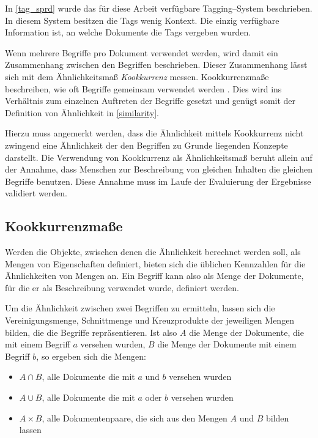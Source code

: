 In \cref{tag_sprd} wurde das für diese Arbeit verfügbare Tagging--System beschrieben. In diesem System besitzen die Tags wenig Kontext. Die einzig verfügbare Information ist, an welche Dokumente die Tags vergeben wurden.

Wenn mehrere Begriffe pro Dokument verwendet werden, wird damit ein Zusammenhang zwischen den Begriffen beschrieben. Dieser Zusammenhang lässt sich mit dem Ähnlichkeitsmaß \emph{Kookkurrenz} messen. Kookkurrenzmaße beschreiben, wie oft Begriffe gemeinsam verwendet werden \cite[S. 21]{zz2011}. Dies wird ins Verhältnis zum einzelnen Auftreten der Begriffe gesetzt und genügt somit der Definition von Ähnlichkeit in \cref{similarity}.

Hierzu muss angemerkt werden, dass die Ähnlichkeit mittels Kookkurrenz nicht zwingend eine Ähnlichkeit der den Begriffen zu Grunde liegenden Konzepte darstellt. Die Verwendung von Kookkurrenz als Ähnlichkeitsmaß beruht allein auf der Annahme, dass Menschen zur Beschreibung von gleichen Inhalten die gleichen Begriffe benutzen. Diese Annahme muss im Laufe der Evaluierung der Ergebnisse validiert werden.

\subsection{Kookkurrenzmaße}
\label{measures}

Werden die Objekte, zwischen denen die Ähnlichkeit berechnet werden soll, als Mengen von Eigenschaften definiert, bieten sich die üblichen Kennzahlen für die Ähnlichkeiten von Mengen an. Ein Begriff kann also als Menge der Dokumente, für die er als Beschreibung verwendet wurde, definiert werden.

Um die Ähnlichkeit zwischen zwei Begriffen zu ermitteln, lassen sich die Vereinigungsmenge, Schnittmenge und Kreuzprodukte der jeweiligen Mengen bilden, die die Begriffe repräsentieren. Ist also \(A\) die Menge der Dokumente, die mit einem Begriff \(a\) versehen wurden, \(B\) die Menge der Dokumente mit einem Begriff \(b\), so ergeben sich die Mengen:

\begin{itemize}
    \item \(A \cap B\), alle Dokumente die mit \(a\) und \(b\) versehen wurden
    \item \(A \cup B\), alle Dokumente die mit \(a\) oder \(b\) versehen wurden
    \item \(A \times B\), alle Dokumentenpaare, die sich aus den Mengen \(A\) und \(B\) bilden lassen
\end{itemize}

